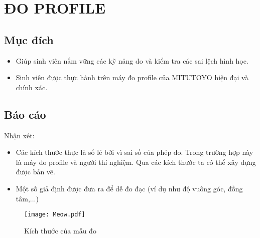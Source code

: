 \chapter{ĐO PROFILE}

\section{Mục đích}
\begin{itemize}
	\item Giúp sinh viên nắm vững các kỹ năng đo và kiểm tra các sai lệch hình học.
	\item Sinh viên được thực hành trên máy đo profile của MITUTOYO hiện đại và chính xác.
\end{itemize}

\section{Báo cáo}
Nhận xét:
\begin{itemize}
	\item Các kích thước thực là số lẻ bởi vì sai số của phép đo. Trong trường hợp này là máy đo profile và người thí nghiệm. Qua các kích thước ta có thể xây dựng được bản vẽ.
	\item Một số giả định được đưa ra để dễ đo đạc (ví dụ như độ vuông góc, đồng tâm,...)
\end{itemize}
\begin{figure}[ht]
	\centering
	\texttt{[image: Meow.pdf]}
	\caption{Kích thước của mẫu đo}
\end{figure}
